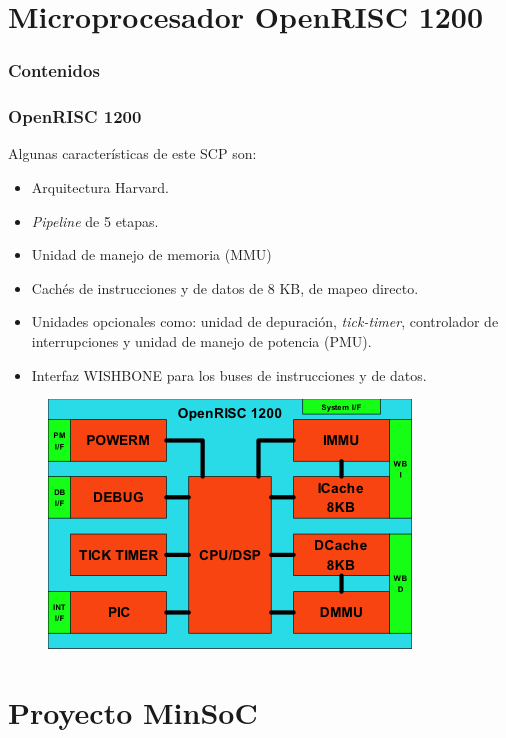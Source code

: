 \documentclass[xcolor=dvipsnames,mathserif,9pt]{beamer}
\begin{document}
\section{Microprocesador OpenRISC 1200}
  \begin{frame}
    \frametitle{Contenidos}
    \tableofcontents[currentsection]
  \end{frame}  

\begin{frame} \frametitle{OpenRISC 1200}%
Algunas características de este SCP son:

\begin{itemize}\itemsep=0.25cm
		 \item  Arquitectura Harvard.
	 	 \item \textit{Pipeline} de 5 etapas.
	 	 \item  Unidad de manejo de memoria (MMU)
		 \item  Cachés de instrucciones y de datos de 8 KB, de mapeo directo.
 		\item Unidades opcionales como: unidad de depuración,\textit{ tick-timer}, controlador de interrupciones y unidad de manejo de potencia (PMU).
		\item Interfaz WISHBONE para los buses de instrucciones y de datos.
\end{itemize}
 
\begin{figure}[!h]
      \centering
     \includegraphics[scale=0.9]{figuras/OR1200}
    \end{figure}
\end{frame}

\section{Proyecto MinSoC}
\end{document}
